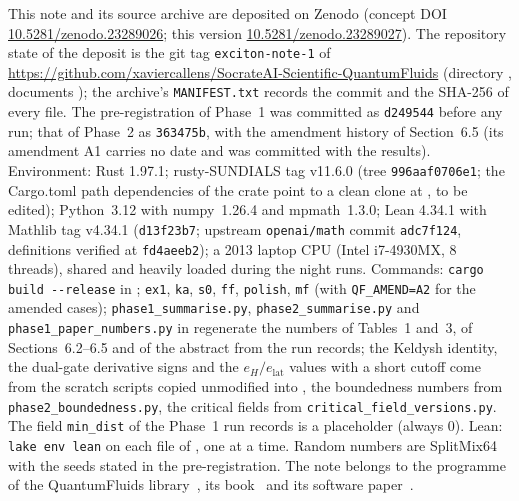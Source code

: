 \documentclass[11pt,a4paper]{article}
\begin{document}
This note and its source archive are deposited on Zenodo (concept DOI \href{https://doi.org/10.5281/zenodo.23289026}{10.5281/zenodo.23289026}; this version
\href{https://doi.org/10.5281/zenodo.23289027}{10.5281/zenodo.23289027}). The repository state of the deposit is the git tag
\texttt{exciton-note-1} of \url{https://github.com/xaviercallens/SocrateAI-Scientific-QuantumFluids} (directory
, documents ); the archive's \texttt{MANIFEST.txt} records the commit and
the SHA-256 of every file. The pre-registration of Phase~1 was committed as \texttt{d249544} before any run; that of Phase~2 as
\texttt{363475b}, with the amendment history of Section~6.5 (its amendment A1 carries no date and was committed with the results).
Environment: Rust 1.97.1; rusty-SUNDIALS tag v11.6.0 (tree \texttt{996aaf0706e1}; the Cargo.toml path dependencies of the crate point to a
clean clone at , to be edited); Python~3.12 with numpy~1.26.4 and mpmath~1.3.0; Lean 4.34.1 with
Mathlib tag v4.34.1 (\texttt{d13f23b7}; upstream \texttt{openai/math} commit \texttt{adc7f124}, definitions verified at
\texttt{fd4aeeb2}); a 2013 laptop CPU (Intel i7-4930MX, 8 threads), shared and heavily loaded during the night runs. Commands:
\texttt{cargo build -{}-release} in ; \texttt{ex1}, \texttt{ka}, \texttt{s0}, \texttt{ff},
\texttt{polish}, \texttt{mf} (with \texttt{QF\_AMEND=A2} for the amended cases); \texttt{phase1\_summarise.py},
\texttt{phase2\_summarise.py} and \texttt{phase1\_paper\_numbers.py} in  regenerate the numbers of Tables~1
and~3, of Sections~6.2--6.5 and of the abstract from the run records; the Keldysh identity, the dual-gate derivative signs and the
$e_H/e_{\mathrm{lat}}$ values with a short cutoff come from the scratch scripts copied unmodified into
, the boundedness numbers from \texttt{phase2\_boundedness.py}, the critical fields from
\texttt{critical\_field\_versions.py}. The field \texttt{min\_dist} of the Phase~1 run records is a placeholder (always 0). Lean:
\texttt{lake env lean} on each file of , one at a time. Random numbers are SplitMix64 with the seeds
stated in the pre-registration. The note belongs to the programme of the QuantumFluids library~\cite{Callens2026lib}, its book~\cite{CallensBook2026}
and its software paper~\cite{Callens2026sw}.



\end{document}
